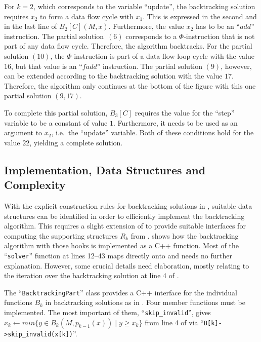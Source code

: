     For $k=2$, which corresponds to the variable ``update'', the backtracking
    solution requires $x_2$ to form a data flow cycle with $x_1$.
    This is expressed  in the second and in the last line of $B_2[C](M,x)$.
    Furthermore, the value $x_2$ has to be an ``$\textit{add}$'' instruction.
    The partial solution~$(6)$ corresponds to a $\Phi$-instruction that is not
    part of any data flow cycle.
    Therefore, the algorithm backtracks.
    For the partial solution $(10)$, the $\Phi$-instruction is part of a data
    flow loop cycle with the value $16$, but that value is an
    ``$\textit{fadd}$'' instruction.
    The partial solution $(9)$, however, can be extended according to the
    backtracking solution with the value $17$.
    Therefore, the algorithm only continues at the bottom of the figure with
    this one partial solution $(9,17)$.

    To complete this partial solution, $B_3[C]$ requires the value for the
    ``step'' variable to be a constant of value $1$.
    Furthermore, it needs to be used as an argument to $x_2$, i.e.\ the
    ``update'' variable.
    Both of these conditions hold for the value $22$, yielding a complete
    solution.

\subsection{Implementation, Data Structures and Complexity}
\label{subsec:impl}

\begin{figure}[p]
    
\end{figure}

    With the explicit construction rules for backtracking solutions in
    , suitable data structures
    can be identified in order to efficiently implement the
    backtracking algorithm.
    This requires a slight extension of  to provide suitable
    interfaces for computing the supporting structures $R_k$ from
    .
     shows how the backtracking algorithm with those hooks is
    implemented as a C++ function.
    Most of the ``{\tt solver}'' function at lines 12--43 maps directly onto
     and needs no further explanation.
    However, some crucial details need elaboration, mostly relating to the
    iteration over the backtracking solution at line 4 of .

    The ``{\tt BacktrackingPart}'' class provides a C++ interface
    for the individual functions $B_k$ in backtracking solutions as in
    .
    Four member functions must be implemented.
    The most important of them, ``{\tt skip\_invalid}'',
    gives $x_k\gets min\{y\in B_k(M,p_{k-1}(x))\mid y\geq x_k\}$
    from line 4 of  via
    ``\lstinline[language={}]!B[k]->skip_invalid(x[k])!''.


